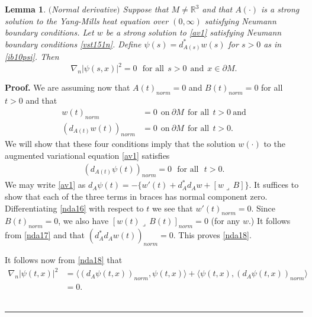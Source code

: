 \documentclass[12pt]{article}
\newtheorem{lemma}[theorem]{Lemma}
\newenvironment{proof}[1][Proof]{\textbf{#1.} }{\ \rule{0.5em}{0.5em}}
\def \<{\langle}
\def \>{\rangle}
\def \R{\mathbb R}
\def \p{\partial}
\def \beq{\begin{equation}}
\def \eeq{\end{equation}}
\def \n{\nabla}
\def \eref{\eqref}
\def \lrc{\lrcorner\,}
\numberwithin{equation}{section}
\begin{document}
 \begin{lemma}\label{lemnda2} $($Normal derivative$)$  Suppose that $M \ne \R^3$
 and  that $A(\cdot)$ is
  a strong solution to the Yang-Mills
 heat equation over $(0, \infty)$  
 satisfying Neumann boundary conditions.  
 Let $w$  be a strong solution  to \eref{av1} satisfying Neumann  
 boundary conditions  \eref{vst151n}.  
 Define  $\psi(s) = d_{A(s)}^* w(s)$ for $s >0$
 as in \eref{ib10psi}.
  Then
 \beq
 \n_n |\psi(s, x)|^2 = 0\ \ \  \text{for all}\ \ s>0  
  \ \ \text{and}\ \ x \in \p M.    \label{nda15}
 \eeq
 \end{lemma}
        \begin{proof} We are assuming now that $A(t)_{norm}=0$ and $B(t)_{norm} =0$ for all $t >0$
        and that  
  \begin{align}
 w(t)_{norm} &= 0\ \ \text{on}\  \p M\ \  \text{for all}\ \ t>0 \ \text{and}  \label{nda16} \\
 (d_{A(t)}w(t))_{norm} &= 0 \ \ \text{on}\  \p M\ \  \text{for all}\ \ t>0.  \label{nda17}
 \end{align}
 We will show  that these four conditions imply that the solution $w(\cdot)$ to the augmented variational equation
 \eref{av1} satisfies
 \begin{align}
 (d_{A(t)}\psi(t))_{norm} = 0\ \ \ \text{for all} \ \ \  t >0.          \label{nda18}
 \end{align}
 We may write \eref{av1} as   $d_A\psi(t) = -\Big\{ w'(t)  +d_A^* d_A w + [ w\lrc B]\Big\}$. 
  It suffices to show that each of the three terms in braces has normal component zero.
  Differentiating \eref{nda16} with respect to $t$ we see that  $  w'(t)_{norm} = 0$. 
 Since $B(t)_{norm} =0$, we also have  $[ w(t) \lrc B(t)]_{norm} =0$ (for any $w$.)    
  It follows from \eref{nda17} and  \cite[ Equ. (3.20)]{CG1} that  $(d_A^*d_A w(t))_{norm} =0$.
 This proves \eref{nda18}.
        
        It follows now from \eref{nda18} that 
 \begin{align*}
 \n_n | \psi(t, x)|^2 &= \<(d_A \psi(t, x))_{norm}, \psi(t, x)\> + \< \psi(t, x), (d_A \psi(t, x))_{norm}\>\\
 &=0.
 \end{align*}    
 \end{proof}   
 
  
\end{document}

